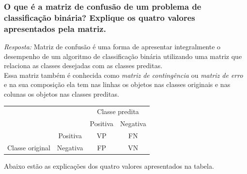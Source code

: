 \documentclass{article}
\begin{document}
\subsubsection{O que é a matriz de confusão de um problema de classificação binária? Explique os quatro valores apresentados pela matriz.}
\textit{Resposta:} Matriz de confusão é uma forma de apresentar integralmente o desempenho de um algoritmo de classificação binária utilizando uma matriz que relaciona as classes desejadas com as classes preditas. \\
Essa matriz também é conhecida como \textit{matriz de contingência} ou \textit{matriz de erro} e na sua composição ela tem nas linhas os objetos nas classes originais e nas colunas os objetos nas classes preditas.

\begin{center}
  \begin{table}[H]
    \centering
      \begin{tabular}{ll|c|c|}
      \cline{3-4}
                                                                                      &                                                       & \multicolumn{2}{c|}{\cellcolor[HTML]{C0C0C0}Classe predita}         \\ \cline{3-4} 
                                                                                      &                                                       & \cellcolor[HTML]{C0C0C0}Positiva & \cellcolor[HTML]{C0C0C0}Negativa \\ \hline
      \multicolumn{1}{|c|}{\cellcolor[HTML]{C0C0C0}}                                  & \multicolumn{1}{c|}{\cellcolor[HTML]{C0C0C0}Positiva} & VP                               & FN                               \\ \cline{2-4} 
      \multicolumn{1}{|c|}{\multirow{-2}{*}{\cellcolor[HTML]{C0C0C0}Classe original}} & \multicolumn{1}{c|}{\cellcolor[HTML]{C0C0C0}Negativa} & FP                               & VN                               \\ \hline
    \end{tabular}
  \end{table}
\end{center}

Abaixo estão as explicações dos quatro valores apresentados na tabela.
\end{document}
